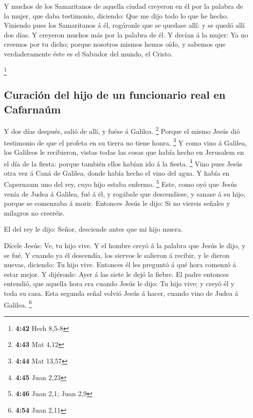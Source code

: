  Y muchos de los Samaritanos de aquella ciudad creyeron
en él por la palabra de la mujer, que daba testimonio, diciendo: Que me
dijo todo lo que he hecho.  Viniendo pues los Samaritanos
á él, rogáronle que se quedase allí: y se quedó allí dos días.
 Y creyeron muchos más por la palabra de él.
 Y decían á la mujer: Ya no creemos por tu dicho; porque
nosotros mismos hemos oído, y sabemos que verdaderamente éste es el
Salvador del mundo, el Cristo.

\footnote{\textbf{4:42} Hech 8,5-8}

\hypertarget{curaciuxf3n-del-hijo-de-un-funcionario-real-en-cafarnauxfam}{%
\subsection{Curación del hijo de un funcionario real en
Cafarnaúm}\label{curaciuxf3n-del-hijo-de-un-funcionario-real-en-cafarnauxfam}}

 Y dos días después, salió de allí, y fuése á Galilea.
\footnote{\textbf{4:43} Mat 4,12}  Porque el mismo Jesús
dió testimonio de que el profeta en su tierra no tiene honra.
\footnote{\textbf{4:44} Mat 13,57}  Y como vino á
Galilea, los Galileos le recibieron, vistas todas las cosas que había
hecho en Jerusalem en el día de la fiesta: porque también ellos habían
ido á la fiesta. \footnote{\textbf{4:45} Juan 2,23}  Vino
pues Jesús otra vez á Caná de Galilea, donde había hecho el vino del
agua. Y había en Capernaum uno del rey, cuyo hijo estaba enfermo.
\footnote{\textbf{4:46} Juan 2,1; Juan 2,9}  Este, como
oyó que Jesús venía de Judea á Galilea, fué á él, y rogábale que
descendiese, y sanase á su hijo, porque se comenzaba á morir.
 Entonces Jesús le dijo: Si no viereis señales y milagros
no creeréis.

 El del rey le dijo: Señor, desciende antes que mi hijo
muera.

 Dícele Jesús: Ve, tu hijo vive. Y el hombre creyó á la
palabra que Jesús le dijo, y se fué.  Y cuando ya él
descendía, los siervos le salieron á recibir, y le dieron nuevas,
diciendo: Tu hijo vive.  Entonces él les preguntó á qué
hora comenzó á estar mejor. Y dijéronle: Ayer á las siete le dejó la
fiebre.  El padre entonces entendió, que aquella hora era
cuando Jesús le dijo: Tu hijo vive; y creyó él y toda su casa.
 Esta segunda señal volvió Jesús á hacer, cuando vino de
Judea á Galilea. \footnote{\textbf{4:54} Juan 2,11}

